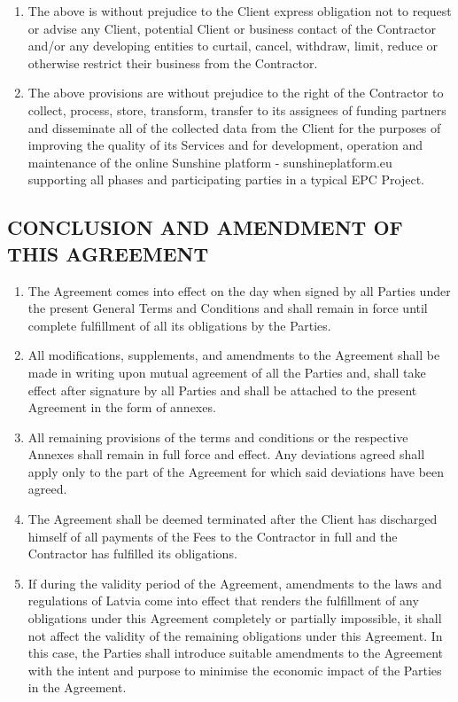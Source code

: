 \begin{multicols}{2}
\begin{enumerate}
	\item	The above is without prejudice to the Client express obligation not to request or advise any Client, potential Client or business contact of the Contractor and/or any developing entities to curtail, cancel, withdraw, limit, reduce or otherwise restrict their business from the Contractor.
	\item	The above provisions are without prejudice to the right of the Contractor to collect, process, store, transform, transfer to its assignees of funding partners and disseminate all of the collected data from the Client for the purposes of improving the quality of its Services and for development, operation and maintenance of the online Sunshine platform - sunshineplatform.eu supporting all phases and participating parties in a typical EPC Project.
\end{enumerate}

\subsection{CONCLUSION AND AMENDMENT OF THIS AGREEMENT}
\begin{enumerate}
	\item	The Agreement comes into effect on the day when signed by all Parties under the present General Terms and Conditions and shall remain in force until complete fulfillment of all its obligations by the Parties.
	\item	All modifications, supplements, and amendments to the Agreement shall be made in writing upon mutual agreement of all the Parties and, shall take effect after signature by all Parties and shall be attached to the present Agreement in the form of annexes.
	\item	All remaining provisions of the terms and conditions or the respective Annexes shall remain in full force and effect. Any deviations agreed shall apply only to the part of the Agreement for which said deviations have been agreed.
	\item	The Agreement shall be deemed terminated after the Client has discharged himself of all payments of the Fees to the Contractor in full and the Contractor has fulfilled its obligations.
	\item	If during the validity period of the Agreement, amendments to the laws and regulations of Latvia come into effect that renders the fulfillment of any obligations under this Agreement completely or partially impossible, it shall not affect the validity of the remaining obligations under this Agreement. In this case, the Parties shall introduce suitable amendments to the Agreement with the intent and purpose to minimise the economic impact of the Parties in the Agreement.
\end{enumerate}


\end{multicols}
